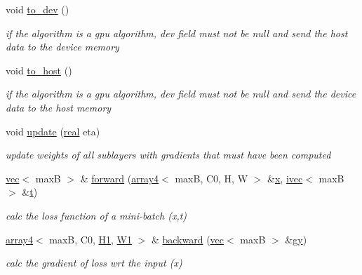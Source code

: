 \begin{DoxyCompactItemize}
\mbox{\label{structVGG_a2f45518df66ff8196e3224367739b590}} 
void \hyperlink{structVGG_a2f45518df66ff8196e3224367739b590}{to\+\_\+dev} ()
\begin{DoxyCompactList}\small\item\em if the algorithm is a gpu algorithm, dev field must not be null and send the host data to the device memory \end{DoxyCompactList}\item 
\mbox{\label{structVGG_ac4ea480624b916204e717a4f8b3b9db1}} 
void \hyperlink{structVGG_ac4ea480624b916204e717a4f8b3b9db1}{to\+\_\+host} ()
\begin{DoxyCompactList}\small\item\em if the algorithm is a gpu algorithm, dev field must not be null and send the device data to the host memory \end{DoxyCompactList}\item 
void \hyperlink{structVGG_a1adaccb289e6577317b49df5e1f3b465}{update} (\hyperlink{vgg__util_8h_a1082d08aaa761215ec83e7149f27ad16}{real} eta)
\begin{DoxyCompactList}\small\item\em update weights of all sublayers with gradients that must have been computed \end{DoxyCompactList}\item 
\hyperlink{structvec}{vec}$<$ maxB $>$ \& \hyperlink{structVGG_a256a1792818900ab2023554cea1ebb31}{forward} (\hyperlink{structarray4}{array4}$<$ maxB, C0, H, W $>$ \&\hyperlink{structVGG_ab352e8c1793b749d92b85e75ca4f66e8}{x}, \hyperlink{structivec}{ivec}$<$ maxB $>$ \&\hyperlink{structVGG_a302cf15e5bd6f920d527334df6f3e2b2}{t})
\begin{DoxyCompactList}\small\item\em calc the loss function of a mini-\/batch (x,t) \end{DoxyCompactList}\item 
\hyperlink{structarray4}{array4}$<$ maxB, C0, \hyperlink{structVGG_a73f189c70eef33b8e8de32929db37b10}{H1}, \hyperlink{structVGG_a01305ab6d90c95eb50c45352203b07e0}{W1} $>$ \& \hyperlink{structVGG_ad6c413558605836d7cffa87dc2971628}{backward} (\hyperlink{structvec}{vec}$<$ maxB $>$ \&\hyperlink{structVGG_a4a45e28a72f469b5b1432ee572627c17}{gy})
\begin{DoxyCompactList}\small\item\em calc the gradient of loss wrt the input (x) \end{DoxyCompactList}\item 

\end{DoxyCompactItemize}
